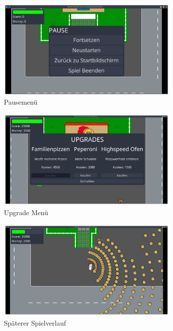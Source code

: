 \documentclass{article}
\begin{document}
			\begin{figure}[H]
				\begin{center}
					\includegraphics[width=0.8\textwidth]{pause.png}
				\end{center}
				\caption{Pausemenü}
			\end{figure}
			\begin{figure}[H]
				\begin{center}
					\includegraphics[width=0.8\textwidth]{upgrade.png}
				\end{center}
				\caption{Upgrade Menü}
			\end{figure}
			\begin{figure}[H]
				\begin{center}
					\includegraphics[width=0.8\textwidth]{lategame.png}
				\end{center}
				\caption{Späterer Spielverlauf}
			\end{figure}
\end{document}
